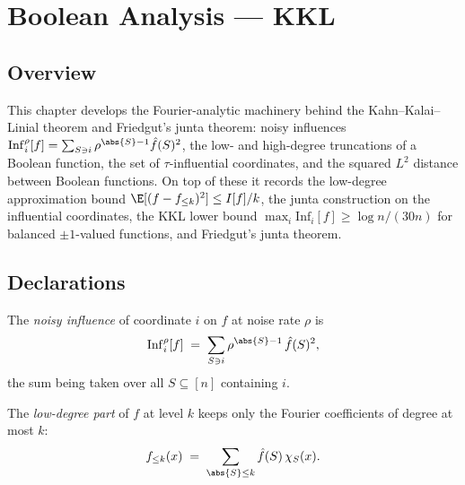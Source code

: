 \chapter{Boolean Analysis — KKL}
\section{Overview}

This chapter develops the Fourier-analytic machinery behind the Kahn--Kalai--Linial
theorem and Friedgut's junta theorem: noisy influences
$\mathrm{Inf}_i^\rho[f] = \sum_{S \ni i}\rho^{\abs{S}-1}\hat f(S)^2$, the low- and
high-degree truncations of a Boolean function, the set of $\tau$-influential
coordinates, and the squared $L^2$ distance between Boolean functions.
On top of these it records the low-degree approximation bound
$\E[(f - f_{\le k})^2] \le I[f]/k$, the junta construction on the influential
coordinates, the KKL lower bound $\max_i \mathrm{Inf}_i[f] \ge \log n/(30n)$ for
balanced $\pm 1$-valued functions, and Friedgut's junta theorem.

\section{Declarations}

\begin{definition}
\label{KKL.noisyInfluence}
\leanok
{}
The \emph{noisy influence} of coordinate $i$ on $f$ at noise rate $\rho$ is
\[
  \mathrm{Inf}_i^{\rho}[f] \;=\; \sum_{S \ni i} \rho^{\abs{S}-1}\,\hat f(S)^2,
\]
the sum being taken over all $S \subseteq [n]$ containing $i$.
\end{definition}

\begin{definition}
\label{KKL.lowDegreePart}
\leanok
{}
The \emph{low-degree part} of $f$ at level $k$ keeps only the Fourier coefficients
of degree at most $k$:
\[
  f_{\le k}(x) \;=\; \sum_{\abs{S}\le k} \hat f(S)\,\chi_S(x).
\]
\end{definition}

